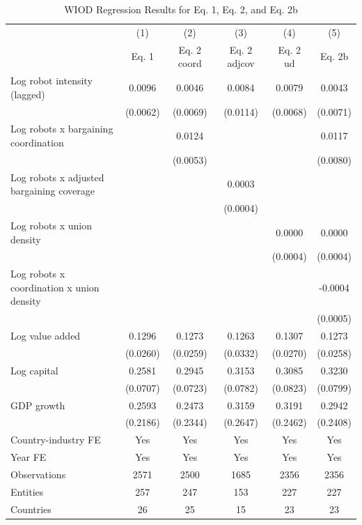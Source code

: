 \begin{table}[!htbp]
\centering
\begin{threeparttable}
\caption{WIOD Regression Results for Eq. 1, Eq. 2, and Eq. 2b}
\label{tab:wiod_regression_table_combined}
\small
\begin{tabular}{lccccc}
\toprule
 & (1) & (2) & (3) & (4) & (5) \\
 & Eq. 1 & Eq. 2 coord & Eq. 2 adjcov & Eq. 2 ud & Eq. 2b \\
\midrule
Log robot intensity (lagged) & 0.0096 & 0.0046 & 0.0084 & 0.0079 & 0.0043 \\
 & (0.0062) & (0.0069) & (0.0114) & (0.0068) & (0.0071) \\
\addlinespace[0.2em]
Log robots x bargaining coordination &  & 0.0124 &  &  & 0.0117 \\
 &  & (0.0053) &  &  & (0.0080) \\
\addlinespace[0.2em]
Log robots x adjusted bargaining coverage &  &  & 0.0003 &  &  \\
 &  &  & (0.0004) &  &  \\
\addlinespace[0.2em]
Log robots x union density &  &  &  & 0.0000 & 0.0000 \\
 &  &  &  & (0.0004) & (0.0004) \\
\addlinespace[0.2em]
Log robots x coordination x union density &  &  &  &  & -0.0004 \\
 &  &  &  &  & (0.0005) \\
\addlinespace[0.2em]
Log value added & 0.1296 & 0.1273 & 0.1263 & 0.1307 & 0.1273 \\
 & (0.0260) & (0.0259) & (0.0332) & (0.0270) & (0.0258) \\
\addlinespace[0.2em]
Log capital & 0.2581 & 0.2945 & 0.3153 & 0.3085 & 0.3230 \\
 & (0.0707) & (0.0723) & (0.0782) & (0.0823) & (0.0799) \\
\addlinespace[0.2em]
GDP growth & 0.2593 & 0.2473 & 0.3159 & 0.3191 & 0.2942 \\
 & (0.2186) & (0.2344) & (0.2647) & (0.2462) & (0.2408) \\
\midrule
Country-industry FE & Yes & Yes & Yes & Yes & Yes \\
Year FE & Yes & Yes & Yes & Yes & Yes \\
Observations & 2571 & 2500 & 1685 & 2356 & 2356 \\
Entities & 257 & 247 & 153 & 227 & 227 \\
Countries & 26 & 25 & 15 & 23 & 23 \\

\end{tabular}
\end{threeparttable}
\end{table}
